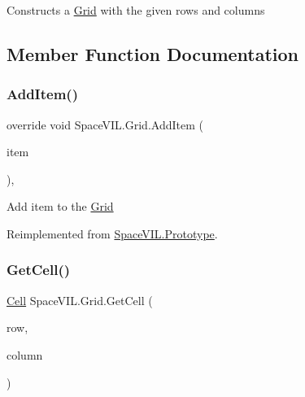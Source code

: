 Constructs a \mbox{\hyperlink{class_space_v_i_l_1_1_grid}{Grid}} with the given rows and columns 



\subsection{Member Function Documentation}
\mbox{\label{class_space_v_i_l_1_1_grid_a5b339dbf56352afd9546f66ef4c02416}} 
\subsubsection{\texorpdfstring{Add\+Item()}{AddItem()}}
{\footnotesize\ttfamily override void Space\+V\+I\+L.\+Grid.\+Add\+Item (\begin{DoxyParamCaption}\item[{\mbox{\hyperlink{interface_space_v_i_l_1_1_core_1_1_i_base_item}{I\+Base\+Item}}}]{item }\end{DoxyParamCaption})\hspace{0.3cm}{\ttfamily [inline]}, {\ttfamily [virtual]}}



Add item to the \mbox{\hyperlink{class_space_v_i_l_1_1_grid}{Grid}} 



Reimplemented from \mbox{\hyperlink{class_space_v_i_l_1_1_prototype}{Space\+V\+I\+L.\+Prototype}}.

\mbox{\label{class_space_v_i_l_1_1_grid_ad6866d757055ed488fac7ccceb62031c}} 
\subsubsection{\texorpdfstring{Get\+Cell()}{GetCell()}}
{\footnotesize\ttfamily \mbox{\hyperlink{class_space_v_i_l_1_1_cell}{Cell}} Space\+V\+I\+L.\+Grid.\+Get\+Cell (\begin{DoxyParamCaption}\item[{int}]{row,  }\item[{int}]{column }\end{DoxyParamCaption})\hspace{0.3cm}{\ttfamily [inline]}}



